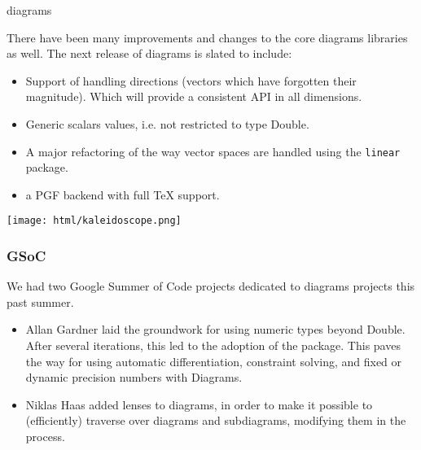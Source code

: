 \begin{hcarentry}[updated]{diagrams}

There have been many improvements and changes to the core
diagrams libraries as well.  The next release of diagrams is
slated to include:
\begin{itemize}
\item Support of handling directions (vectors which have forgotten their magnitude).
  Which will provide a consistent API in all dimensions.
\item Generic scalars values, i.e. not restricted to type 
  Double.
\item A major refactoring of the way vector spaces are handled
  using the \texttt{linear} package.
\item a PGF backend with full TeX support.
\end{itemize}


\begin{center}
\texttt{[image: html/kaleidoscope.png]}
\end{center}


\subsubsection*{GSoC}

We had two Google Summer of Code projects dedicated to diagrams
projects this past summer.

\begin{itemize}
\item Allan Gardner laid the groundwork for using numeric types beyond
Double.  After several iterations, this led to the adoption of the
 package. This paves the way for using automatic
differentiation, constraint solving, and fixed or dynamic precision
numbers with Diagrams.
\item Niklas Haas  added lenses to diagrams, in order 
to make it possible to (efficiently) traverse over diagrams and 
subdiagrams, modifying them in the process.
\end{itemize}



\end{hcarentry}

